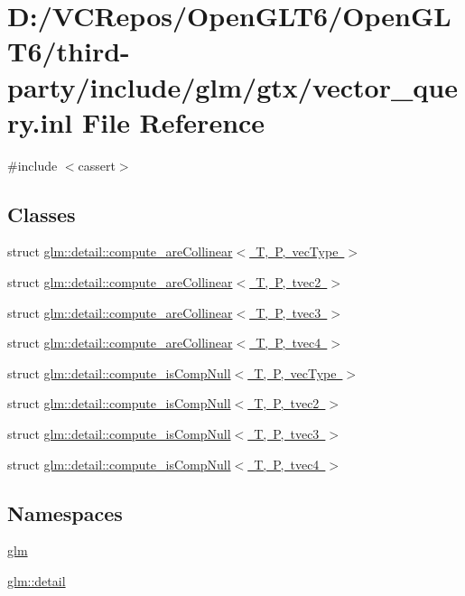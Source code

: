 \hypertarget{vector__query_8inl}{}\section{D\+:/\+V\+C\+Repos/\+Open\+G\+L\+T6/\+Open\+G\+L\+T6/third-\/party/include/glm/gtx/vector\+\_\+query.inl File Reference}
\label{vector__query_8inl}
{\ttfamily \#include $<$cassert$>$}\newline
\subsection*{Classes}
\begin{DoxyCompactItemize}
\item 
struct \mbox{\hyperlink{structglm_1_1detail_1_1compute__are_collinear}{glm\+::detail\+::compute\+\_\+are\+Collinear$<$ T, P, vec\+Type $>$}}
\item 
struct \mbox{\hyperlink{structglm_1_1detail_1_1compute__are_collinear_3_01_t_00_01_p_00_01tvec2_01_4}{glm\+::detail\+::compute\+\_\+are\+Collinear$<$ T, P, tvec2 $>$}}
\item 
struct \mbox{\hyperlink{structglm_1_1detail_1_1compute__are_collinear_3_01_t_00_01_p_00_01tvec3_01_4}{glm\+::detail\+::compute\+\_\+are\+Collinear$<$ T, P, tvec3 $>$}}
\item 
struct \mbox{\hyperlink{structglm_1_1detail_1_1compute__are_collinear_3_01_t_00_01_p_00_01tvec4_01_4}{glm\+::detail\+::compute\+\_\+are\+Collinear$<$ T, P, tvec4 $>$}}
\item 
struct \mbox{\hyperlink{structglm_1_1detail_1_1compute__is_comp_null}{glm\+::detail\+::compute\+\_\+is\+Comp\+Null$<$ T, P, vec\+Type $>$}}
\item 
struct \mbox{\hyperlink{structglm_1_1detail_1_1compute__is_comp_null_3_01_t_00_01_p_00_01tvec2_01_4}{glm\+::detail\+::compute\+\_\+is\+Comp\+Null$<$ T, P, tvec2 $>$}}
\item 
struct \mbox{\hyperlink{structglm_1_1detail_1_1compute__is_comp_null_3_01_t_00_01_p_00_01tvec3_01_4}{glm\+::detail\+::compute\+\_\+is\+Comp\+Null$<$ T, P, tvec3 $>$}}
\item 
struct \mbox{\hyperlink{structglm_1_1detail_1_1compute__is_comp_null_3_01_t_00_01_p_00_01tvec4_01_4}{glm\+::detail\+::compute\+\_\+is\+Comp\+Null$<$ T, P, tvec4 $>$}}
\end{DoxyCompactItemize}
\subsection*{Namespaces}
\begin{DoxyCompactItemize}
\item 
 \mbox{\hyperlink{namespaceglm}{glm}}
\item 
 \mbox{\hyperlink{namespaceglm_1_1detail}{glm\+::detail}}
\end{DoxyCompactItemize}
